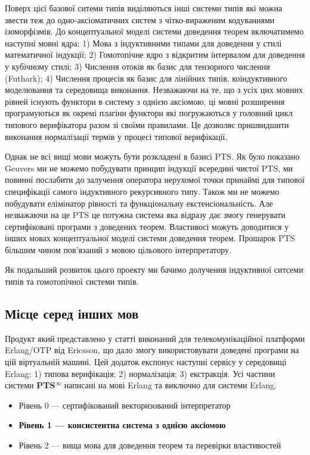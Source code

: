 \documentclass{article}
\begin{document}
Поверх цієї базової ситеми типів виділяються інші системи типів які можна звести теж до одно-аксіоматичних систем
з чітко-вираженим кодуваннями ізоморфізмів. До концептуальної моделі системи доведення теорем включатимемо
наступні мовні ядра:
1) Мова з індуктивними типами для доведення у стилі математичної індукції;
2) Гомотопічне ядро з відкритим інтервалом для доведення у кубічному стилі;
3) Числення отоків як базис для тензорного числення (Futhark);
4) Числення процесів як базис для лінійних типів, коіндуктивного моделювання та середовища виконання.
Незважаючи на те, що з усіх цих мовних рівней існують функтори в систему з однією аксіомою, ці мовні розширення
програмуються як окремі плагіни функтори які погружаються у головний цикл типового верифікатора разом зі своїми правилами.
Це дозволяє пришвидшити виконання нормалізації термів у процесі типової верифікації.

Однак не всі вищі мови можуть бути розкладені в базисі PTS.
Як було показано Geuvers\cite{Geuvers01} ми не можемо побудувати принцип індукції всередині чистої PTS, ми повинні послабити
до залучення оператора нерухомої точки принаймі для типової специфікації самого індуктивного рекурсивного типу.
Також ми не можемо побудувати елімінатор рівності та функціональну екстенсіональність. Але незважаючи на це PTS
це потужна система яка відразу дає змогу генерувати сертифіковані програми з доведених теорем. Властивосі можуть доводитися
у інших мовах концептуальної моделі системи доведення теорем. Прошарок PTS більшим чином пов'язаний з мовою цільового інтерпретатору.

Як подальший розвиток цього проекту ми бачимо долучення індуктивної ситсеми типів та гомотопічної системи типів.

\subsection{Місце серед інших мов}
Продукт який представлено у статті виконаний для телекомунікаційної платформи Erlang/OTP від Ericsson,
що дало змогу використовувати доведені програми на цій віртуальній машині. Цей додаток експонує наступні
сервісу у середовищі Erlang: 1) типова верифікація; 2) нормалізація; 3) екстракція.
Усі частини системи \textbf{PTS$^\infty$} написані на мові Erlang та виключно для системи Erlang.

\begin{itemize}
\item Рівень 0 --- сертифікований векторизований інтерпретатор
\item {\bf Рівень 1 --- консистентна система з однією аксіомою}
\item Рівень 2 --- вища мова для доведення теорем та перевірки властивостей
\end{itemize}
\end{document}

